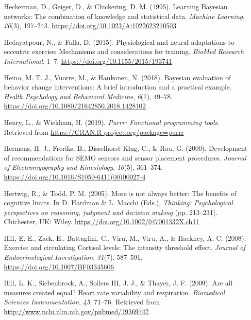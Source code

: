 \documentclass[man,floatsintext]{apa6}
\begin{document}
\leavevmode\hypertarget{ref-Heckerman1995}{}%
Heckerman, D., Geiger, D., \& Chickering, D. M. (1995). Learning Bayesian networks: The combination of knowledge and statistical data. \emph{Machine Learning}, \emph{20}(3), 197--243. \url{https://doi.org/10.1023/A:1022623210503}

\leavevmode\hypertarget{ref-Hedayatpour2015}{}%
Hedayatpour, N., \& Falla, D. (2015). Physiological and neural adaptations to eccentric exercise: Mechanisms and considerations for training. \emph{BioMed Research International}, 1--7. \url{https://doi.org/10.1155/2015/193741}

\leavevmode\hypertarget{ref-Heino2018}{}%
Heino, M. T. J., Vuorre, M., \& Hankonen, N. (2018). Bayesian evaluation of behavior change interventions: A brief introduction and a practical example. \emph{Health Psychology and Behavioral Medicine}, \emph{6}(1), 49--78. \url{https://doi.org/10.1080/21642850.2018.1428102}

\leavevmode\hypertarget{ref-R-purrr}{}%
Henry, L., \& Wickham, H. (2019). \emph{Purrr: Functional programming tools}. Retrieved from \url{https://CRAN.R-project.org/package=purrr}

\leavevmode\hypertarget{ref-Hermens2000}{}%
Hermens, H. J., Freriks, B., Disselhorst-Klug, C., \& Rau, G. (2000). Development of recommendations for SEMG sensors and sensor placement procedures. \emph{Journal of Electromyography and Kinesiology}, \emph{10}(5), 361--374. \url{https://doi.org/10.1016/S1050-6411(00)00027-4}

\leavevmode\hypertarget{ref-Hertwig2005}{}%
Hertwig, R., \& Todd, P. M. (2005). More is not always better: The benefits of cognitive limits. In D. Hardman \& L. Macchi (Eds.), \emph{Thinking: Psychological perspectives on reasoning, judgment and decision making} (pp. 213--231). Chichester, UK: Wiley. \url{https://doi.org/10.1002/047001332X.ch11}

\leavevmode\hypertarget{ref-Hill2008}{}%
Hill, E. E., Zack, E., Battaglini, C., Viru, M., Viru, A., \& Hackney, A. C. (2008). Exercise and circulating Cortisol levels: The intensity threshold effect. \emph{Journal of Endocrinological Investigation}, \emph{31}(7), 587--591. \url{https://doi.org/10.1007/BF03345606}

\leavevmode\hypertarget{ref-Hill2009}{}%
Hill, L. K., Siebenbrock, A., Sollers III, J. J., \& Thayer, J. F. (2009). Are all measures created equal? Heart rate variability and respiration. \emph{Biomedical Sciences Instrumentation}, \emph{45}, 71--76. Retrieved from \url{http://www.ncbi.nlm.nih.gov/pubmed/19369742}
\end{document}
